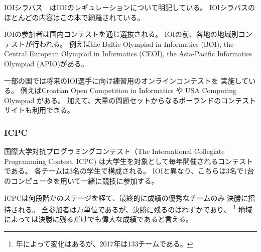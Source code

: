 IOIシラバス\cite{iois}　はIOIのレギュレーションについて明記している。
IOIシラバスのほとんどの内容はこの本で網羅されている。

IOIの参加者は国内コンテストを通じ選抜される。
IOIの前、各地の地域別コンテストが行われる。
例えばthe Baltic Olympiad in Informatics (BOI),
the Central European Olympiad in Informatics (CEOI),
the Asia-Pacific Informatics Olympiad (APIO)がある。

一部の国では将来のIOI選手に向け練習用のオンラインコンテストを
実施している。
例えばCroatian Open Competition in Informatics \cite{coci}や
USA Computing Olympiad \cite{usaco}がある。
加えて、大量の問題セットからなるポーランドのコンテストサイトも利用できる\cite{main}。

\subsubsection{ICPC}


\begin{comment}
The International Collegiate Programming Contest (ICPC)
is an annual programming contest for university students.
Each team in the contest consists of three students,
and unlike in the IOI, the students work together;
there is only one computer available for each team.

The ICPC consists of several stages, and finally the
best teams are invited to the World Finals.
While there are tens of thousands of participants
in the contest, there are only a small number\footnote{The exact number of final
slots varies from year to year; in 2017, there were 133 final slots.} of final slots available,
so even advancing to the finals
is a great achievement in some regions.
\end{comment}

国際大学対抗プログラミングコンテスト（The International Collegiate Programming Contest, ICPC)
は大学生を対象として毎年開催されるコンテストである。
各チームは3名の学生で構成される。
IOIと異なり、こちらは3名で1台のコンピュータを用いて一緒に競技に参加する。

ICPCは何段階かのステージを経て、最終的に成績の優秀なチームのみ
決勝に招待される。
全参加者は万単位であるが、決勝に残るのはわずかであり、
\footnote{年によって変化はあるが、2017年は133チームである。}
地域によっては決勝に残るだけでも偉大な成績であると言える。

\begin{comment}
In each ICPC contest, the teams have five hours of time to
solve about ten algorithm problems.
A solution to a problem is accepted only if it solves
all test cases efficiently.
During the contest, competitors may view the results of other teams,
but for the last hour the scoreboard is frozen and it
is not possible to see the results of the last submissions.

The topics that may appear at the ICPC are not so well
specified as those at the IOI.
In any case, it is clear that more knowledge is needed
at the ICPC, especially more mathematical skills.
\end{comment}

